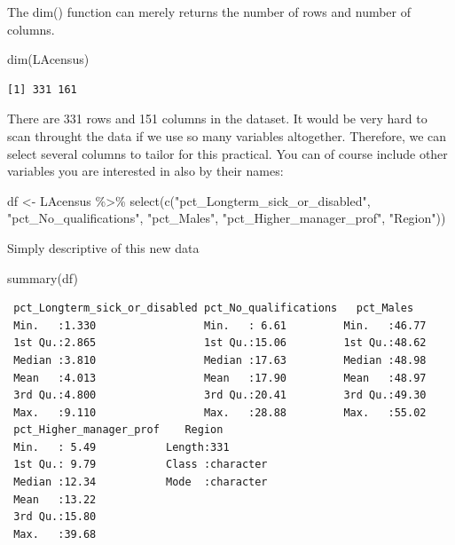 \documentclass[
  letterpaper,
  DIV=11,
  numbers=noendperiod]{scrreprt}
\newenvironment{Shaded}{\begin{snugshade}}{\end{snugshade}}
\newcommand{\FunctionTok}[1]{\textcolor[rgb]{0.28,0.35,0.67}{#1}}
\newcommand{\NormalTok}[1]{\textcolor[rgb]{0.00,0.23,0.31}{#1}}
\newcommand{\OtherTok}[1]{\textcolor[rgb]{0.00,0.23,0.31}{#1}}
\newcommand{\SpecialCharTok}[1]{\textcolor[rgb]{0.37,0.37,0.37}{#1}}
\newcommand{\StringTok}[1]{\textcolor[rgb]{0.13,0.47,0.30}{#1}}
\begin{document}
The dim() function can merely returns the number of rows and number of
columns.

\begin{Shaded}
\begin{Highlighting}[]
\FunctionTok{dim}\NormalTok{(LAcensus) }
\end{Highlighting}
\end{Shaded}

\begin{verbatim}
[1] 331 161
\end{verbatim}

There are 331 rows and 151 columns in the dataset. It would be very hard
to scan throught the data if we use so many variables altogether.
Therefore, we can select several columns to tailor for this practical.
You can of course include other variables you are interested in also by
their names:

\begin{Shaded}
\begin{Highlighting}[]
\NormalTok{df }\OtherTok{\textless{}{-}}\NormalTok{ LAcensus }\SpecialCharTok{\%\textgreater{}\%} \FunctionTok{select}\NormalTok{(}\FunctionTok{c}\NormalTok{(}\StringTok{"pct\_Longterm\_sick\_or\_disabled"}\NormalTok{,}
                            \StringTok{"pct\_No\_qualifications"}\NormalTok{,}
                            \StringTok{"pct\_Males"}\NormalTok{,}
                            \StringTok{"pct\_Higher\_manager\_prof"}\NormalTok{,}
                            \StringTok{"Region"}\NormalTok{))}
\end{Highlighting}
\end{Shaded}

Simply descriptive of this new data

\begin{Shaded}
\begin{Highlighting}[]
\FunctionTok{summary}\NormalTok{(df)}
\end{Highlighting}
\end{Shaded}

\begin{verbatim}
 pct_Longterm_sick_or_disabled pct_No_qualifications   pct_Males    
 Min.   :1.330                 Min.   : 6.61         Min.   :46.77  
 1st Qu.:2.865                 1st Qu.:15.06         1st Qu.:48.62  
 Median :3.810                 Median :17.63         Median :48.98  
 Mean   :4.013                 Mean   :17.90         Mean   :48.97  
 3rd Qu.:4.800                 3rd Qu.:20.41         3rd Qu.:49.30  
 Max.   :9.110                 Max.   :28.88         Max.   :55.02  
 pct_Higher_manager_prof    Region         
 Min.   : 5.49           Length:331        
 1st Qu.: 9.79           Class :character  
 Median :12.34           Mode  :character  
 Mean   :13.22                             
 3rd Qu.:15.80                             
 Max.   :39.68                             
\end{verbatim}
\end{document}
